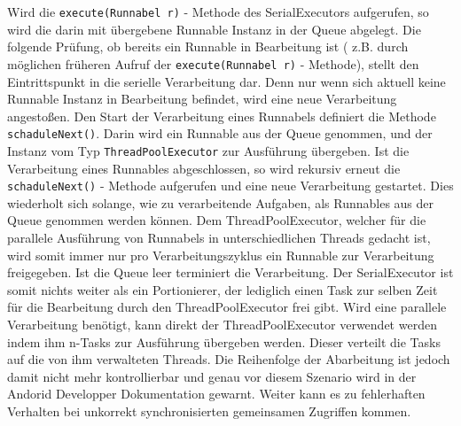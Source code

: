 \documentclass[12pt,oneside,a4paper,bibtotoc,liststotoc]{scrreprt}
\begin{document}
Wird die \texttt{execute(Runnabel r)} - Methode des SerialExecutors aufgerufen, so wird die darin mit übergebene Runnable Instanz in der Queue abgelegt. Die folgende Prüfung, ob bereits ein Runnable in Bearbeitung ist ( z.B. durch möglichen früheren Aufruf der \texttt{execute(Runnabel r)} - Methode), stellt den Eintrittspunkt in die serielle Verarbeitung dar. Denn nur wenn sich aktuell keine Runnable Instanz in Bearbeitung befindet, wird eine neue Verarbeitung angestoßen. Den Start der Verarbeitung eines Runnabels definiert die Methode \texttt{schaduleNext()}. Darin wird ein Runnable aus der Queue genommen, und der Instanz vom Typ \texttt{ThreadPoolExecutor} zur Ausführung übergeben. Ist die Verarbeitung eines Runnables abgeschlossen, so wird rekursiv erneut die \texttt{schaduleNext()} - Methode aufgerufen und eine neue Verarbeitung gestartet. Dies wiederholt sich solange, wie zu verarbeitende Aufgaben, als Runnables aus der Queue genommen werden können.  Dem ThreadPoolExecutor, welcher für die parallele Ausführung von Runnabels in unterschiedlichen Threads gedacht ist, wird somit immer nur pro Verarbeitungszyklus ein Runnable zur Verarbeitung freigegeben. Ist die Queue leer terminiert die Verarbeitung. Der SerialExecutor ist somit nichts weiter als ein Portionierer, der lediglich einen Task zur selben Zeit für die Bearbeitung durch den ThreadPoolExecutor frei gibt.\newline
Wird eine parallele Verarbeitung benötigt, kann direkt der ThreadPoolExecutor verwendet werden indem ihm n-Tasks zur Ausführung übergeben werden. Dieser verteilt die Tasks auf die von ihm verwalteten Threads. Die Reihenfolge der Abarbeitung ist jedoch damit nicht mehr kontrollierbar und genau vor diesem Szenario wird in der Andorid Developper Dokumentation gewarnt. Weiter kann es zu fehlerhaften Verhalten bei unkorrekt synchronisierten gemeinsamen Zugriffen kommen.\newline
\end{document}
